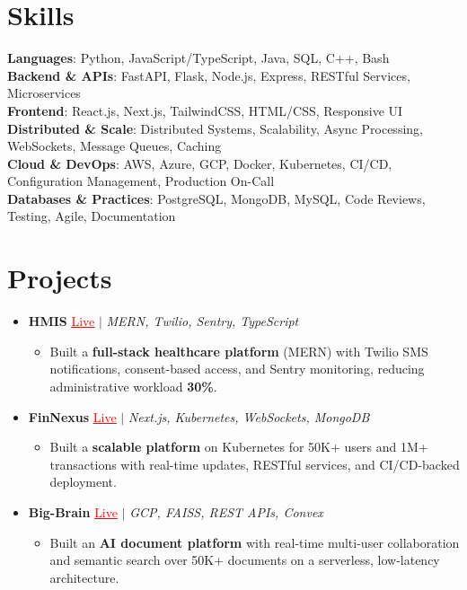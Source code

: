 \documentclass[letterpaper,10pt]{article}
\newcommand{\resumeItem}[1]{\item\small{{#1 \vspace{-2pt}}}}
\newcommand{\resumeProjectHeading}[1]{\item \small #1 \vspace{-2pt}}
\newcommand{\resumeSubHeadingListStart}{\begin{itemize}[leftmargin=0.0in, label={}]}
\newcommand{\resumeSubHeadingListEnd}{\end{itemize}}
\newcommand{\resumeProjItemListStart}{\begin{itemize}[leftmargin=0.15in,label=\textbullet,itemsep=0pt,topsep=0pt,parsep=0pt,partopsep=0pt]}
\newcommand{\resumeProjItemListEnd}{\end{itemize}\vspace{-4pt}}
\begin{document}
\section{Skills}
\begin{itemize}[leftmargin=0.15in, label={}]
\small{\item{
\textbf{Languages}: Python, JavaScript/TypeScript, Java, SQL, C++, Bash \\
\textbf{Backend \& APIs}: FastAPI, Flask, Node.js, Express, RESTful Services, Microservices \\
\textbf{Frontend}: React.js, Next.js, TailwindCSS, HTML/CSS, Responsive UI \\
\textbf{Distributed \& Scale}: Distributed Systems, Scalability, Async Processing, WebSockets, Message Queues, Caching \\
\textbf{Cloud \& DevOps}: AWS, Azure, GCP, Docker, Kubernetes, CI/CD, Configuration Management, Production On-Call \\
\textbf{Databases \& Practices}: PostgreSQL, MongoDB, MySQL, Code Reviews, Testing, Agile, Documentation
}}
\end{itemize}
\vspace{-6pt}
\section{Projects}
\resumeSubHeadingListStart
\vspace{-2pt}
\resumeProjectHeading{\textbf{HMIS} {\href{https://hims-rouge.vercel.app/}{\textcolor{red}{\underline{Live}}}} $|$ \emph{MERN, Twilio, Sentry, TypeScript}}
\resumeProjItemListStart
\resumeItem{Built a \textbf{full-stack healthcare platform} (MERN) with Twilio SMS notifications, consent-based access, and Sentry monitoring, reducing administrative workload \textbf{30\%}.}
\resumeProjItemListEnd
\vspace{3pt}
\resumeProjectHeading{\textbf{FinNexus} {\href{https://fin-nexus.vercel.app/}{\textcolor{red}{\underline{Live}}}} $|$ \emph{Next.js, Kubernetes, WebSockets, MongoDB}}
\resumeProjItemListStart
\resumeItem{Built a \textbf{scalable platform} on Kubernetes for 50K+ users and 1M+ transactions with real-time updates, RESTful services, and CI/CD-backed deployment.}
\resumeProjItemListEnd
\vspace{3pt}
\resumeProjectHeading{\textbf{Big-Brain} {\href{https://big-brain-pied.vercel.app/}{\textcolor{red}{\underline{Live}}}} $|$ \emph{GCP, FAISS, REST APIs, Convex}}
\resumeProjItemListStart
\resumeItem{Built an \textbf{AI document platform} with real-time multi-user collaboration and semantic search over 50K+ documents on a serverless, low-latency architecture.}
\resumeProjItemListEnd
\resumeSubHeadingListEnd
\end{document}
